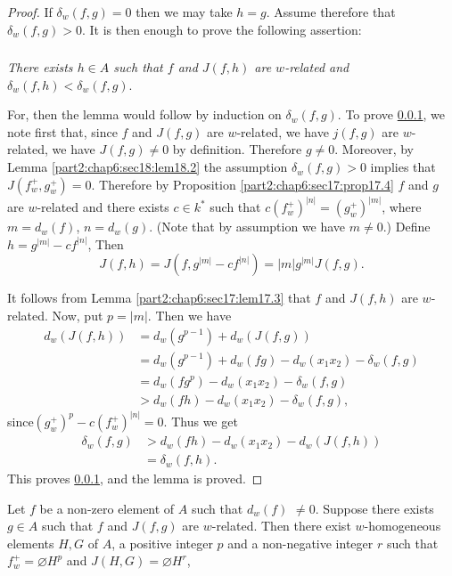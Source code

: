 \begin{proof}
  If $\delta_w (f, g)=0$ then we may take $h=g$. Assume therefore that
  $\delta_w (f, g)> 0$. It is then enough to prove the following
  assertion:

\setcounter{subsubsection}{0}
\setcounter{mysubsection}{3}
\subsubsection{} \label{part2:chap6:sec18:sss18.3.1}
{\em There exists $h \in A$ such that $f$ and $J(f,
  h)$ are $w$-related and} $\delta_w (f, h)< \delta_w (f, g)$.

For, then the lemma would follow by induction on $\delta_w (f, g)$. To
prove \ref{part2:chap6:sec18:sss18.3.1}, we note first that, since $f$
and $J(f, g)$ are $w$-related, we have $j(f, g)$ are $w$-related, we
have $J(f, g)\neq 0$ by definition. Therefore $g \neq 0$. Moreover, by
Lemma \ref{part2:chap6:sec18:lem18.2} the assumption $\delta_w (f, g)>
0$ implies that $J(f_w^+, g_w^+)=0$. Therefore by Proposition
\ref{part2:chap6:sec17:prop17.4} $f$ and $g$ are $w$-related and there
exists $c \in k^*$ such that $c(f_w^+)^{|n|}= (g_w^+)^{|m|}$, where
$m= d_w (f)$, $n= d_w (g)$. (Note that by assumption we have $m \neq
0$.) Define $h= g^{|m|}- cf^{|n|}$, Then 
$$
J(f, h)= J(f, g^{|m|} - cf^{|n|}) = |m|g^{|m|} J(f, g).
$$

It follows from Lemma \ref{part2:chap6:sec17:lem17.3} that $f$ and
$J(f, h)$ are $w$-related. Now, put $p= |m|$. Then we have
\begin{align*}
  d_w (J (f, h)) & = d_w (g^{p-1}) + d_w (J (f, g))\\
  & = d_w (g^{p-1}) + d_w (fg)- d_w (x_1 x_2) - \delta_w (f, g)\\
  & = d_w (fg^p)- d_w (x_1 x_2) - \delta_w (f, g)\\
  & > d_w (fh) - d_w (x_1 x_2)- \delta_w (f, g),
\end{align*}
since\pageoriginale $(g_w^+)^p - c(f_w^+)^{|n|}=0$. Thus we get
\begin{align*}
  \delta_w (f, g) & > d_w (fh) - d_w (x_1 x_2) - d_w (J(f, h))\\
  & = \delta_w (f, h).
\end{align*}
This proves \ref{part2:chap6:sec18:sss18.3.1}, and the lemma is proved.
\end{proof}

\begin{coro}\label{part2:chap6:sec18:coro18.4}
  Let $f$ be a non-zero element of $A$ such that $d_w (f)$ $\neq
  0$. Suppose there exists $g \in A$ such that $f$ and $J(f, g)$ are
  $w$-related. Then there exist $w$-homogeneous elements $H, G$ of
  $A$, a positive integer $p$ and a non-negative integer $r$ such that
  $f_w^+= \diameter H^p$ and $J(H, G)= \diameter H^r$,
\end{coro}

